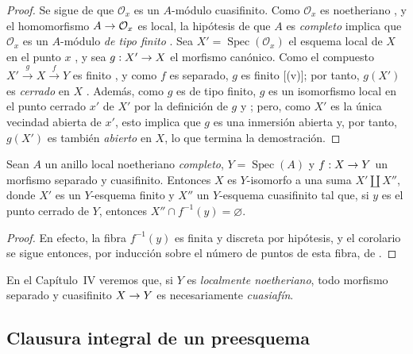 \documentclass[oneside,10pt]{amsart}
\makeatletter
\newcommand{\ega@arrow}[2]{\mathchoice{#1}{#2}{#2}{#2}}
\renewcommand{\to}{\ega@arrow{\longrightarrow}{\rightarrow}}
\let\EGAOriginalLabel\label
\renewcommand{\label}[1]{\phantomsection\EGAOriginalLabel{#1}}
\makeatother
\begin{document}
\begin{proof}
Se sigue de  que $\mathcal{O}_x$ es un $A$-módulo cuasifinito.
Como $\mathcal{O}_x$ es noetheriano , y el homomorfismo $A\to\mathcal{O}_x$ es local, la hipótesis de que $A$ es \emph{completo} implica que $\mathcal{O}_x$ es un $A$-módulo \emph{de tipo finito} .
Sea $X'=\operatorname{Spec}(\mathcal{O}_x)$ el esquema local de $X$ en el punto $x$ , y sea $g:X'\to X$ el morfismo canónico.
Como el compuesto $X'\xrightarrow{g}X\xrightarrow{f}Y$ es finito , y como $f$ es separado, $g$ es finito [(v)]; por tanto, $g(X')$ es \emph{cerrado} en $X$ .
Además, como $g$ es de tipo finito, $g$ es un isomorfismo local en el punto cerrado $x'$ de $X'$ por la definición de $g$ y ;
pero, como $X'$ es la única vecindad abierta de $x'$, esto implica que $g$ es una inmersión abierta y, por tanto, $g(X')$ es también \emph{abierto} en $X$, lo que termina la demostración.
\end{proof}

\begin{corollary}[6.2.6]
\label{II.6.2.6-fr}
Sean $A$ un anillo local noetheriano \emph{completo}, $Y=\operatorname{Spec}(A)$ y $f:X\to Y$ un morfismo separado y cuasifinito.
Entonces $X$ es $Y$-isomorfo a una suma $X'\amalg X''$, donde $X'$ es un $Y$-esquema finito y $X''$ un $Y$-esquema cuasifinito tal que, si $y$ es el punto cerrado de $Y$, entonces $X''\cap f^{-1}(y)=\varnothing$.
\end{corollary}

\begin{proof}
En efecto, la fibra $f^{-1}(y)$ es finita y discreta por hipótesis, y el corolario se sigue entonces, por inducción sobre el número de puntos de esta fibra, de .
\end{proof}

\begin{remark}[6.2.7]
\label{II.6.2.7-fr}
En el Capítulo~IV veremos que, si $Y$ es \emph{localmente noetheriano}, todo morfismo separado y cuasifinito $X\to Y$ es necesariamente \emph{cuasiafín}.
\end{remark}

\subsection{Clausura integral de un preesquema}
\label{subsection:II.6.3-fr}
\end{document}
